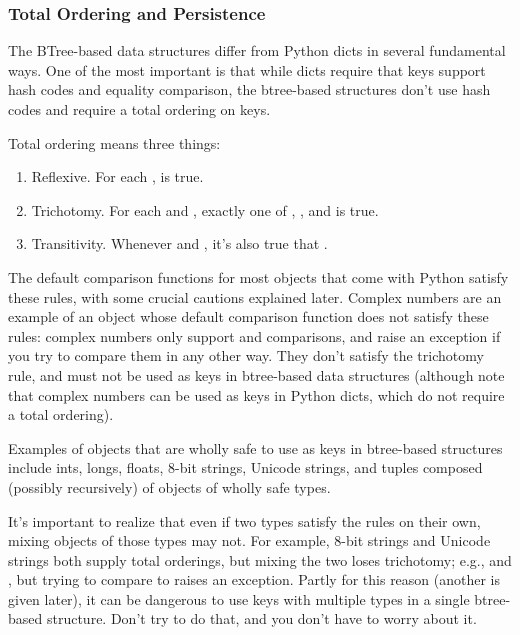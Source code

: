 \subsubsection{Total Ordering and Persistence}

The BTree-based data structures differ from Python dicts in several
fundamental ways.  One of the most important is that while dicts
require that keys support hash codes and equality comparison,
the btree-based structures don't use hash codes and require a total
ordering on keys.

Total ordering means three things:

\begin{enumerate}
\item  Reflexive.  For each ,  is true.

\item  Trichotomy.  For each  and , exactly one of
       , , and
        is true.

\item  Transitivity.  Whenever  and
       , it's also true that
       .
\end{enumerate}

The default comparison functions for most objects that come with Python
satisfy these rules, with some crucial cautions explained later.  Complex
numbers are an example of an object whose default comparison function
does not satisfy these rules:  complex numbers only support \code{==}
and \code{!=} comparisons, and raise an exception if you try to compare
them in any other way.  They don't satisfy the trichotomy rule, and must
not be used as keys in btree-based data structures (although note that
complex numbers can be used as keys in Python dicts, which do not require
a total ordering).

Examples of objects that are wholly safe to use as keys in btree-based
structures include ints, longs, floats, 8-bit strings, Unicode strings,
and tuples composed (possibly recursively) of objects of wholly safe
types.

It's important to realize that even if two types satisfy the
rules on their own, mixing objects of those types may not.  For example,
8-bit strings and Unicode strings both supply total orderings, but mixing
the two loses trichotomy; e.g.,  and
, but trying to compare  to
 raises an exception.  Partly for this reason (another is
given later), it can be dangerous to use keys with multiple types in
a single btree-based structure.  Don't try to do that, and you don't
have to worry about it.

